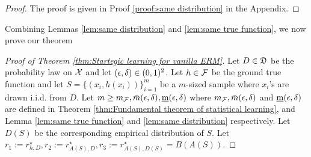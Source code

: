 \begin{proof} The proof is given in Proof \ref{proof:same distribution} in the Appendix.
\end{proof}




Combining Lemmas \ref{lem:same distribution} and \ref{lem:same true function}, we now prove our theorem
\begin{proof}[Proof of Theorem \ref{thm:Startegic learning for vanilla ERM}]
Let $D \in \mathfrak{D}$ be the probability law on $\mathcal{X}$ and let $(\epsilon,\delta) \in (0,1)^2$. Let $h \in \mathcal{F}$ be the ground true function and let $S = \{(x_i,h(x_i))\}_{i=1}^m$ be a $m$-sized sample where $x_i$'s are drawn i.i.d. from $D$. Let $m \geq m_{\mathcal{F}},\bar{m}(\epsilon,\delta),\underbar{m}(\epsilon,\delta)$ where $m_{\mathcal{F}}, \bar{m}(\epsilon,\delta)$ and $\underbar{m}(\epsilon,\delta)$ are defined in Theorem \ref{thm:Fundamental theorem of statistical learning}, and Lemma \ref{lem:same true function} and \ref{lem:same distribution} respectively.
Let $D(S)$ be the corresponding empirical distribution of $S$.
Let $r_1 := r^\star_{h,D}, 
r_2 := r^\star_{A(S),D},
r_3 := r^\star_{A(S),D(S)} = B(A(S)).$


\end{proof}
